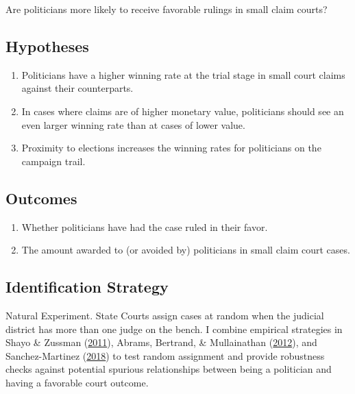 \documentclass[]{article}
\begin{document}
Are politicians more likely to receive favorable rulings in small claim
courts?

\hypertarget{hypotheses-1}{%
\subsection{Hypotheses}\label{hypotheses-1}}

\begin{enumerate}
\item
  Politicians have a higher winning rate at the trial stage in small
  court claims against their counterparts.
\item
  In cases where claims are of higher monetary value, politicians should
  see an even larger winning rate than at cases of lower value.
\item
  Proximity to elections increases the winning rates for politicians on
  the campaign trail.
\end{enumerate}

\hypertarget{outcomes-1}{%
\subsection{Outcomes}\label{outcomes-1}}

\begin{enumerate}
\item
  Whether politicians have had the case ruled in their favor.
\item
  The amount awarded to (or avoided by) politicians in small claim court
  cases.
\end{enumerate}

\hypertarget{identification-strategy-1}{%
\subsection{Identification Strategy}\label{identification-strategy-1}}

Natural Experiment. State Courts assign cases at random when the
judicial district has more than one judge on the bench. I combine
empirical strategies in Shayo \& Zussman
(\protect\hyperlink{ref-ShayoJudicialIngroupBias2011}{2011}), Abrams,
Bertrand, \& Mullainathan
(\protect\hyperlink{ref-AbramsJudgesVaryTheir2012}{2012}), and
Sanchez-Martinez
(\protect\hyperlink{ref-Sanchez-MartinezDismantlingInstitutionsCourt2018}{2018})
to test random assignment and provide robustness checks against
potential spurious relationships between being a politician and having a
favorable court outcome.
\end{document}
